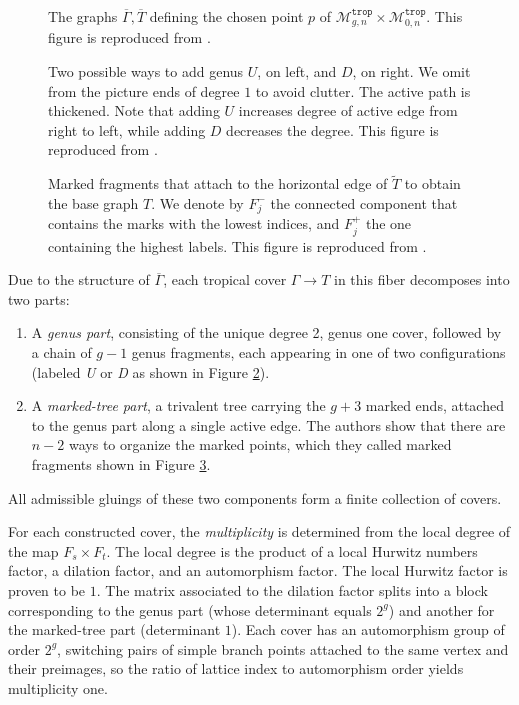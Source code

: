 \documentclass[11pt,reqno]{amsart}
\newcommand{\inputTikZ}[2]{%
     \resizebox{#1}{!}{}}
\theoremstyle{definition}
\newcommand\trop{{\mathtt{trop}}}
\newcommand\Mgn[1]{\mathcal M_{#1}}
\begin{document}
\begin{figure}[tb]
    \centering
    \inputTikZ{\textwidth}{Figures/generalimage}
    \caption{The graphs $\overline{\Gamma}, \overline{T}$ defining  the chosen point $p$ of $\Mgn{g,n}^\trop\times \Mgn{0,n}^\trop$. This figure is reproduced from \cite{troptev}.}
    \label{fig:genim}
\end{figure}

\begin{figure}[tb]
    \centering
    \inputTikZ{.7\textwidth}{Figures/2genusoptions}
    \caption{Two possible ways to add genus $U$, on left, and $D$, on right. We omit from the picture ends of degree $1$ to avoid clutter. The active path is thickened. Note that adding $U$ increases degree of active edge from right to left, while adding $D$ decreases the degree. This figure is reproduced from \cite{troptev}.}
    \label{fig:2genusoptions}
\end{figure}

\begin{figure}[tb]
    \centering
    \inputTikZ{.9\textwidth}{Figures/fragments}
    \caption{Marked fragments that attach to the horizontal edge of $\tilde{T}$ to obtain the base graph $T$. We denote by $F_j^-$ the connected component that contains the marks with the lowest indices, and $F_j^+$  the one containing the highest labels. This figure is reproduced from \cite{troptev}.}
    \label{fig:markfrag}
\end{figure}
Due to the structure of $\overline{\Gamma}$, each tropical cover $\Gamma \to T$ in this fiber decomposes into two parts:
\begin{enumerate}
  \item A \emph{genus part}, consisting of the unique degree 2, genus one cover, followed by a chain of $g-1$ genus fragments, each appearing in one of two configurations (labeled \textit{U} or \textit{D} as shown in Figure \ref{fig:2genusoptions}).
  \item A \emph{marked-tree part}, a trivalent tree carrying the $g+3$ marked ends, attached to the genus part along a single active edge. The authors show that there are $n-2$ ways to organize the marked points, which they called marked fragments shown in Figure \ref{fig:markfrag}. \end{enumerate}
All admissible gluings of these two components form a finite collection of covers. 

For each constructed cover, the \emph{multiplicity} is determined from the local degree of the map $F_s \times F_t$. The local degree is the product of a local Hurwitz numbers factor, a dilation factor, and an automorphism factor. The local Hurwitz factor is proven to be $1$. The matrix associated to the dilation factor splits into a block corresponding to the genus part (whose determinant equals $2^{g}$) and another for the marked-tree part (determinant $1$). Each cover has an automorphism group of order $2^{g}$,
switching pairs of simple branch points attached to the same vertex and their preimages, so the ratio of lattice index to automorphism order yields multiplicity one. 
\end{document}
